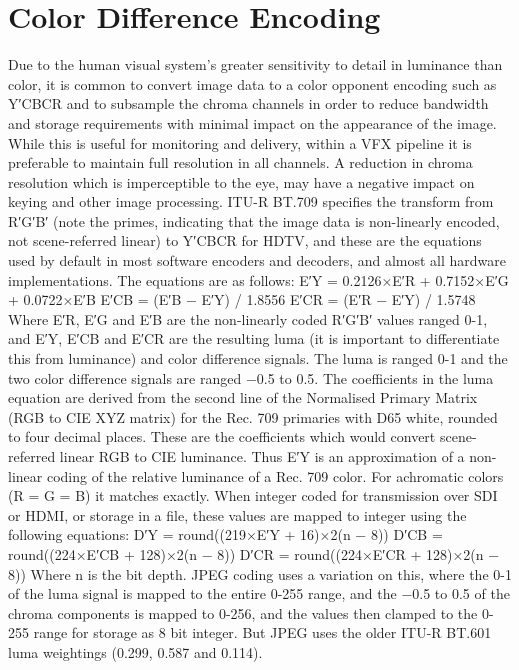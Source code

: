 \section{Color Difference Encoding}%
\label{sec:color-difference-encoding}

Due to the human visual system’s greater sensitivity to detail in luminance than color, it is common to convert image data to a color opponent encoding such as Y′CBCR and to subsample the chroma channels in order to reduce bandwidth and storage requirements with minimal impact on the appearance of the image. While this is useful for monitoring and delivery, within a VFX pipeline it is preferable to maintain full resolution in all channels. A reduction in chroma resolution which is imperceptible to the eye, may have a negative impact on keying and other image processing.
ITU-R BT.709 specifies the transform from R′G′B′ (note the primes, indicating that the image data is non-linearly encoded, not scene-referred linear) to Y′CBCR for HDTV, and these are the equations used by default in most software encoders and decoders, and almost all hardware implementations. The equations are as follows:
	E′Y = 0.2126×E′R + 0.7152×E′G + 0.0722×E′B
	E′CB =  (E′B − E′Y) / 1.8556
	E′CR =  (E′R − E′Y) / 1.5748
Where E′R, E′G and E′B are the non-linearly coded R′G′B′ values ranged 0-1, and E′Y, E′CB and E′CR are the resulting luma (it is important to differentiate this from luminance) and color difference signals. The luma is ranged 0-1 and the two color difference signals are ranged −0.5 to 0.5.
The coefficients in the luma equation are derived from the second line of the Normalised Primary Matrix (RGB to CIE XYZ matrix) for the Rec. 709 primaries with D65 white, rounded to four decimal places. These are the coefficients which would convert scene-referred linear RGB to CIE luminance. Thus E′Y is an approximation of a non-linear coding of the relative luminance of a Rec. 709 color. For achromatic colors (R = G = B) it matches exactly.
When integer coded for transmission over SDI or HDMI, or storage in a file, these values are mapped to integer using the following equations:
	D′Y = round((219×E′Y + 16)×2(n − 8))
	D′CB = round((224×E′CB + 128)×2(n − 8))
	D′CR = round((224×E′CR + 128)×2(n − 8))
Where n is the bit depth.
JPEG coding uses a variation on this, where the 0-1 of the luma signal is mapped to the entire 0-255 range, and the −0.5 to 0.5 of the chroma components is mapped to 0-256, and the values then clamped to the 0-255 range for storage as 8 bit integer. But JPEG uses the older ITU-R BT.601 luma weightings (0.299, 0.587 and 0.114).
